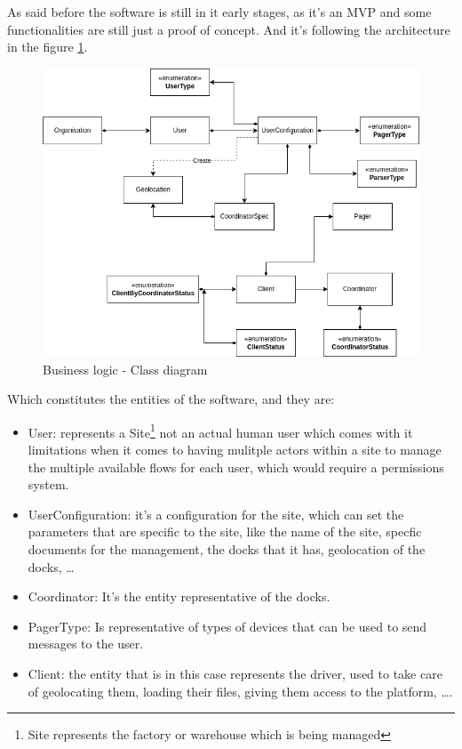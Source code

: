 As said before the software is still in it early stages, as it's an MVP and some
functionalities are still just a proof of concept. And it's following the architecture
in the figure \ref{fig:entities_cd}.

\begin{figure}[!ht]
    \centering
    \includegraphics[width=1\textwidth]{images/Conceptual Model.png}
    \caption{\footnotesize{Business logic - Class diagram}}
    \label{fig:entities_cd}
\end{figure}

Which constitutes the entities of the software, and they are:

\begin{itemize}
    \item User: represents a Site\footnote{Site represents the factory
        or warehouse which is being managed} not an actual human user
        which comes with it limitations when it comes to having mulitple
        actors within a site to manage the multiple available flows for
        each user, which would require a permissions system.
    \item UserConfiguration: it's a configuration for the site, which
        can set the parameters that are specific to the site,
        like the name of the site, specfic documents for the management,
        the docks that it has, geolocation of the docks, \dots
    \item Coordinator: It's the entity representative of the docks.
    \item PagerType: Is representative of types of devices that can
        be used to send messages to the user.
    \item Client: the entity that is in this case represents the driver,
        used to take care of geolocating them, loading their files,
        giving them access to the platform, \dots.
\end{itemize}

